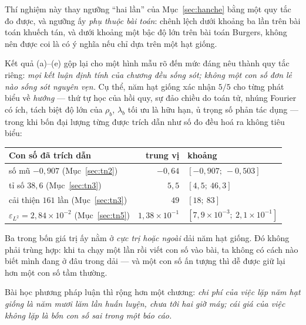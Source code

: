 \begin{nhanxet}
\label{nx:doc-tn8}
Thí nghiệm này thay ngưỡng ``hai lần'' của Mục~\ref{sec:hanche} bằng một quy tắc
đo được, và ngưỡng ấy \emph{phụ thuộc bài toán}: chênh lệch dưới khoảng ba lần
trên bài toán khuếch tán, và dưới khoảng một bậc độ lớn trên bài toán Burgers,
không nên được coi là có ý nghĩa nếu chỉ dựa trên một hạt giống.

Kết quả (a)--(e) gộp lại cho một hình mẫu rõ đến mức đáng nêu thành quy tắc
riêng: \emph{mọi kết luận định tính của chương đều sống sót; không một con số
đơn lẻ nào sống sót nguyên vẹn.} Cụ thể, năm hạt giống xác nhận $5/5$ cho từng
phát biểu về \emph{hướng} --- thứ tự học của hồi quy, sự đảo chiều do toán tử,
nhúng Fourier có ích, tách biệt độ lớn của $\rho_b$, $\lambda_b$ tối ưu là hữu
hạn, ủ trọng số phản tác dụng --- trong khi bốn đại lượng từng được trích dẫn
như số đo đều hoá ra không tiêu biểu:

\begin{center}
\small
\begin{tabular}{@{}l r l@{}}
\toprule
\textbf{Con số đã trích dẫn} & \textbf{trung vị} & \textbf{khoảng} \\
\midrule
số mũ $-0{,}907$ (Mục~\ref{sec:tn2})        & $-0{,}64$ & $[-0{,}907;\ -0{,}503]$ \\
tỉ số $38{,}6$ (Mục~\ref{sec:tn3})          & $5{,}5$   & $[4{,}5;\ 46{,}3]$ \\
cải thiện $161$ lần (Mục~\ref{sec:tn3})     & $49$      & $[18;\ 83]$ \\
$\varepsilon_{L^2} = 2{,}84\times10^{-2}$ (Mục~\ref{sec:tn5})
  & $1{,}38\times10^{-1}$ & $[7{,}9\times10^{-3};\ 2{,}1\times10^{-1}]$ \\
\bottomrule
\end{tabular}
\end{center}

Ba trong bốn giá trị ấy nằm ở \emph{cực trị hoặc ngoài} dải năm hạt giống. Đó
không phải trùng hợp: khi ta chạy một lần rồi viết con số vào bài, ta không có
cách nào biết mình đang ở đâu trong dải --- và một con số ấn tượng thì dễ được
giữ lại hơn một con số tầm thường.

Bài học phương pháp luận thì rộng hơn một chương: \emph{chi phí của việc lặp năm
hạt giống là năm mươi lăm lần huấn luyện, chưa tới hai giờ máy; cái giá của việc
không lặp là bốn con số sai trong một báo cáo.}
\end{nhanxet}

